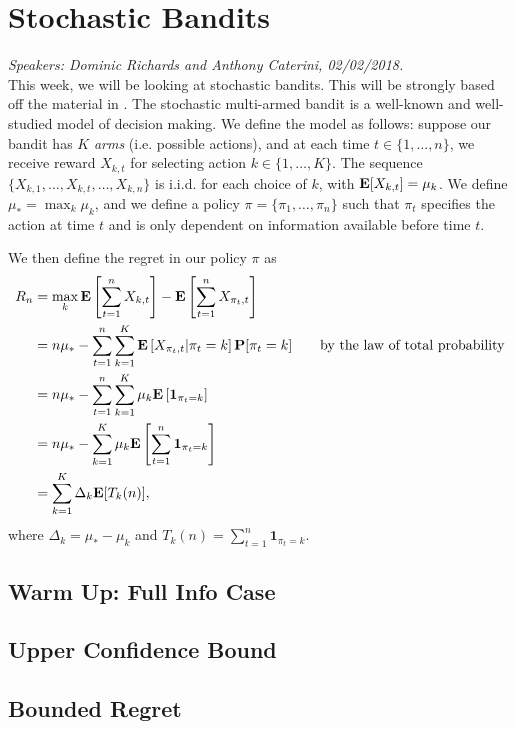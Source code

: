 \section{Stochastic Bandits} 
\emph{Speakers: Dominic Richards and Anthony Caterini, 02/02/2018.}\\

This week, we will be looking at stochastic bandits. This will be strongly based off the material in \cite[Lecture~18]{rigollet}. The stochastic multi-armed bandit is a well-known and well-studied model of decision making. We define the model as follows: suppose our bandit has $K$ \emph{arms} (i.e. possible actions), and at each time $t \in \{1, \ldots, n\}$, we receive reward $X_{k,t}$ for selecting action $k \in \{1, \ldots, K\}$. The sequence $\{X_{k, 1}, \ldots, X_{k, t}, \ldots, X_{k, n}\}$ is i.i.d. for each choice of $k$, with $\mathbf{E}[X_{k,t}] = \mu_k$. We define $\mu_* = \max_k \mu_k$, and we define a policy $\pi = \{\pi_1, \ldots, \pi_n\}$ such that $\pi_t$ specifies the action at time $t$ and is only dependent on information available before time $t$.

We then define the regret in our policy $\pi$ as 
\begin{align*}
R_n &= \max_k \mathbf{E}\left[\sum_{t = 1}^n X_{k,t} \right] - \mathbf{E}\left[\sum_{t=1}^n X_{\pi_t, t} \right] \\
&= n \mu_* - \sum_{t=1}^n \sum_{k=1}^K \mathbf{E}\left[ X_{\pi_t, t} | \pi_t = k\right] \mathbf{P}[\pi_t = k] \qquad \text{by the law of total probability} \\
&= n \mu_* - \sum_{t=1}^n \sum_{k=1}^K \mu_k \mathbf{E}\left[ \mathbf{1}_{\pi_t = k}\right] \\
&= n \mu_* - \sum_{k=1}^K \mu_k \mathbf{E} \left[\sum_{t=1}^n \mathbf{1}_{\pi_t = k} \right] \\
&= \sum_{k=1}^K \Delta_k \mathbf{E}[T_k(n)],
\end{align*}
where $\Delta_k = \mu_* - \mu_k$ and $T_k(n) = \sum_{t=1}^n \mathbf{1}_{\pi_t = k}$. 

\subsection{Warm Up: Full Info Case} 

\subsection{Upper Confidence Bound}

\subsection{Bounded Regret}